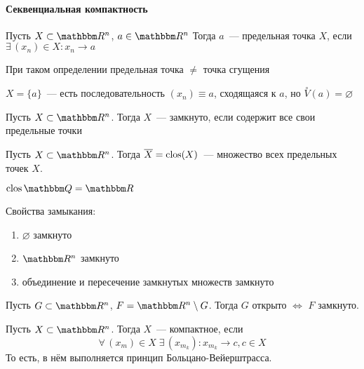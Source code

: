 \documentclass[12pt]{../../notes}
\begin{document}
\paragraph{Секвенциальная компактность}

\begin{defn}\label{defn:limpoint}
  Пусть $X \subset \R^n$, $a\in \R^n$ Тогда $a$~--- предельная точка $X$, если 
  $\exists\, (x_n)\in X \colon x_n \to a$
\end{defn}

\begin{rem*}
  При таком определении предельная точка $\neq$ точка сгущения
\end{rem*}

\begin{exmp*}
  $X = \{a\}$~--- есть последовательность $(x_n) \equiv a$, сходящаяся к $a$, но
  $\overset{\circ}{V}(a) = \varnothing$
\end{exmp*}

\begin{defn}\label{defn:closedRn}
  Пусть $X\subset \R^n$. Тогда $X$~--- замкнуто, если содержит все свои предельные точки
\end{defn}

\begin{defn}[Замыкание]\label{defn:closureRn}
  Пусть $X \subset \R^n$. Тогда $\overline{X} = \operatorname{\mathrm{clos}}(X)$~--- множество всех предельных точек $X$.
\end{defn}

\begin{exmp*}
  $\clos \Q = \R$
\end{exmp*}

Свойства замыкания:
\begin{enumerate}
  \item $\varnothing$ замкнуто
  \item $\R^n$ замкнуто
  \item объединение и пересечение замкнутых множеств замкнуто
\end{enumerate}

\begin{thrm}\label{thrm:closopenRn}
  Пусть $G \subset \R^n$, $F = \R^n \setminus G$. Тогда $G$ открыто $\Leftrightarrow$ $F$ замкнуто.
\end{thrm}

\begin{defn}\label{defn:seqcompRn}
  Пусть $X\subset \R^n$. Тогда $X$~--- компактное, если 
  \[
    \forall\, (x_m) \in X \; \exists\, (x_{m_k}) \colon x_{m_k} \to c , c \in X
  \]
  То есть, в нём выполняется принцип Больцано-Вейерштрасса.
\end{defn}
\end{document}
